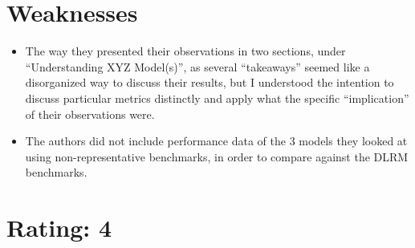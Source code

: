 \documentclass [12pt]{article}
\begin{document}
    \section{Weaknesses} %
    \label{sec:weaknesses}
        \begin{itemize}
            \item The way they presented their observations in two sections, under ``Understanding XYZ Model(s)'', as several ``takeaways'' seemed like a disorganized way to discuss their results, but I understood the intention to discuss particular metrics distinctly and apply what the specific ``implication'' of their observations were.
            \item The authors did not include performance data of the 3 models they looked at using non-representative benchmarks, in order to compare against the DLRM benchmarks. 
        \end{itemize}

    \section{Rating: 4} %
    \label{sec:rating}
\end{document}
